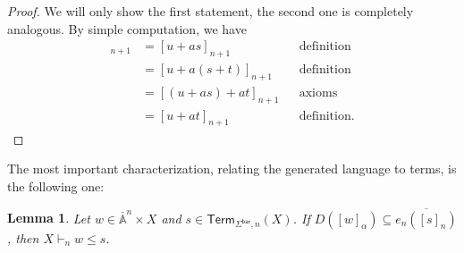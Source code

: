 \documentclass[11pt,a4paper]{amsart}
\newtheorem{lemma}[lemma]{Lemma}
\newcommand{\Br}{\mathsf{bar}}
\newcommand{\Term}{\mathsf{Term}}
\newcommand{\Names}{\mathbb{A}}
\newcommand{\barNames}{\overline{\Names}}
\theoremstyle{plain}
\numberwithin{equation}{section}
\newcommand{\+}[1]{\mathcal{#1}\xspace}
\theoremstyle{definition}
\begin{document}
\begin{proof}
  We will only show the first statement, the second one is completely analogous.
  By simple computation, we have
  \begin{align*}
    [u]_{n + 1}
    &= [u + as]_{n + 1} && \text{definition} \\
    &= [u + a(s + t)]_{n + 1} && \text{definition} \\
    &= [(u + as) + at]_{n + 1} && \text{axioms} \\
    &= [u + at]_{n + 1} && \text{definition}.
  \end{align*}
\end{proof}

The most important characterization, relating the generated language to terms, is the following one:

\begin{lemma}\label{lem:language-subset-inequality}
  Let \(w \in \barNames^n \times X\) and \(s \in \Term_{\Sigma^\Br, n}(X)\).
  If \(D([w]_\alpha) \subseteq \overline{e_n([s]_n)}\), then \(X \vdash_n w \le s\).
\end{lemma}
\end{document}
